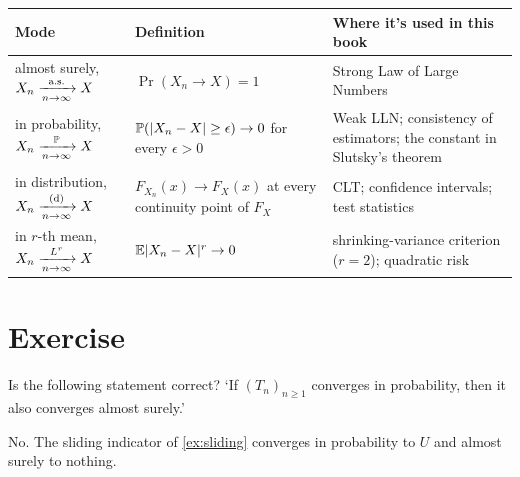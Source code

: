 \begin{center}
\small
\begin{tabular}{@{}>{\raggedright\arraybackslash}p{1.45in}>{\raggedright\arraybackslash}p{2.2in}>{\raggedright\arraybackslash}p{2.3in}@{}}
\toprule
Mode & Definition & Where it's used in this book \\
\midrule
almost surely, $X_n \xrightarrow [n \to \infty ]{\text{a.s.}} X$ & $\Pr(X_n \to X) = 1$ & Strong Law of Large Numbers \\[4pt]
in probability, $X_n \xrightarrow [n \to \infty ]{\mathbb{P}} X$ & $\mathbb{P}(\lvert X_n - X\rvert \geq \epsilon) \to 0$ for every $\epsilon > 0$ & Weak LLN; consistency of estimators; the constant in Slutsky's theorem \\[4pt]
in distribution, $X_n \xrightarrow [n \to \infty ]{\text{(d)}} X$ & $F_{X_n}(x) \to F_X(x)$ at every continuity point of $F_X$ & CLT; confidence intervals; test statistics \\[4pt]
in $r$-th mean, $X_n \xrightarrow [n \to \infty ]{L^{r}} X$ & $\operatorname*{\mathbb{E}}\lvert X_n - X\rvert^r \to 0$ & shrinking-variance criterion ($r = 2$); quadratic risk \\
\bottomrule
\end{tabular}
\end{center}

\section{Exercise}

\begin{exercise}
Is the following statement correct? `If $(T_n)_{n \geq 1}$ converges in probability, then it also converges almost surely.'
\end{exercise}
\begin{solution}
No. The sliding indicator of \cref{ex:sliding} converges in probability to $U$ and almost surely to nothing.
\end{solution}
